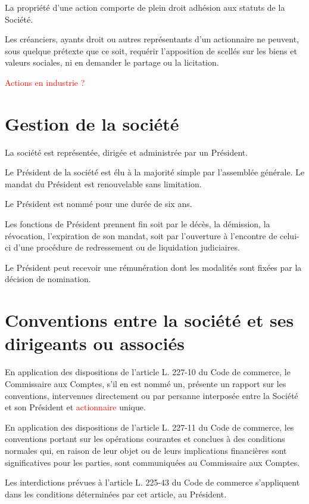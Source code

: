 \documentclass[a4paper,12pt]{report}
\begin{document}
La propriété d'une action comporte de plein droit adhésion aux statuts de la Société.

Les créanciers, ayants droit ou autres représentants d'un actionnaire ne peuvent, sous quelque prétexte que ce soit, 
requérir l'apposition de scellés sur les biens et valeurs sociales, ni en demander le partage ou la licitation.

\textcolor{red}{Actions en industrie ?}

\section{Gestion de la société}
La société est représentée, dirigée et administrée par un Président.

Le Président de la société est élu à la majorité simple par l'assemblée générale. 
Le mandat du Président est renouvelable sans limitation.

Le Président est nommé pour une durée de six ans.

Les fonctions de Président prennent fin soit par le décès, la démission, la révocation, l'expiration de son mandat, 
soit par l'ouverture à l'encontre de celui-ci d'une procédure de redressement ou de liquidation judiciaires.

Le Président peut recevoir une rémunération dont les modalités sont fixées par la décision de nomination.

\section{Conventions entre la société et ses dirigeants ou associés}
En application des dispositions de l'article L. 227-10 du Code de commerce, le Commissaire aux Comptes, s'il en est nommé un, présente un rapport sur les conventions, 
intervenues directement ou par persanne interposée entre la Société et son Président et \textcolor{red}{actionnaire} unique.

En application des dispositions de l'article L. 227-11 du Code de commerce, les conventions portant sur les opérations courantes et conclues à des conditions normales qui, 
en raison de leur objet ou de leurs implications financières sont significatives pour les parties, sont communiquées au Commissaire aux Comptes.

Les interdictions prévues à l'article L. 225-43 du Code de commerce s'appliquent dans les conditions déterminées par cet article, au Président.
\end{document}

